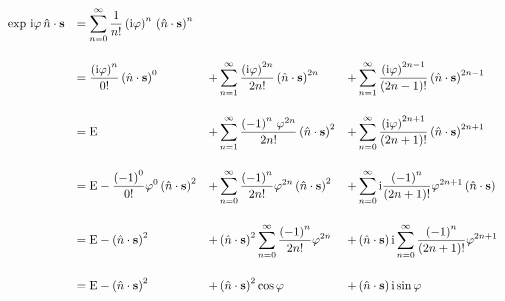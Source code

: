 \documentclass[10pt,a4paper]{article}
\newcommand{\const}[1]{\text{\rmfamily\upshape #1}}
\renewcommand{\i}{\const{i}}
\begin{document}
\begin{equation*}
\begin{array}{rlll}
    \exp \, \i \varphi \,
    \hat{n} \cdot \mathbf{s}
    &\displaystyle =
    \sum_{n=0}^\infty
    \frac{1}{n!}
    \left(\i \varphi\right)^n \,
    \left(\hat{n} \cdot \mathbf{s}\right)^n
    \\[25pt]
    &\displaystyle =
    \frac{\left(\i\varphi\right)^n}{0!}
    \left(\hat{n} \cdot \mathbf{s}\right)^0
    &\displaystyle +
    \sum_{n=1}^\infty
    \frac{\left(\i\varphi\right)^{2n}}{2n!}
    \left(\hat{n} \cdot \mathbf{s}\right)^{2n}
    &\displaystyle +
    \sum_{n=1}^\infty
    \frac{\left(\i\varphi\right)^{2n-1}}{(2n-1)!}
    \left(\hat{n} \cdot \mathbf{s}\right)^{2n-1}
    \\[25pt]
    &\displaystyle =
    \const{E}
    &\displaystyle +
    \sum_{n=1}^\infty
    \frac{\left(-1\right)^n \, \varphi^{2n}}{2n!}
    \left(\hat{n} \cdot \mathbf{s}\right)^2
    &\displaystyle +
    \sum_{n=0}^\infty
    \frac{\left(\i\varphi\right)^{2n+1}}{(2n+1)!}
    \left(\hat{n} \cdot \mathbf{s}\right)^{2n+1}
    \\[25pt]
    &\displaystyle =
    \const{E}
    -
    \frac{\left(-1\right)^0}{0!}
    \varphi^{0}
    \left(\hat{n} \cdot \mathbf{s}\right)^2
    &\displaystyle +
    \sum_{n=0}^\infty
    \frac{\left(-1\right)^n}{2n!}
    \varphi^{2n}
    \left(\hat{n} \cdot \mathbf{s}\right)^2
    &\displaystyle +
    \sum_{n=0}^\infty
    \i
    \frac{\left(-1\right)^n}{(2n+1)!}
    \varphi^{2n+1}
    \left(\hat{n} \cdot \mathbf{s}\right)
    \\[25pt]
    &\displaystyle =
    \const{E}
    -
    \left(\hat{n} \cdot \mathbf{s}\right)^2
    &\displaystyle +
    \left(\hat{n} \cdot \mathbf{s}\right)^2
    \sum_{n=0}^\infty
    \frac{\left(-1\right)^n}{2n!}
    \varphi^{2n}
    &\displaystyle +
    \left(\hat{n} \cdot \mathbf{s}\right)
    \i
    \sum_{n=0}^\infty
    \frac{\left(-1\right)^n}{(2n+1)!}
    \varphi^{2n+1}
    \\[25pt]
    &\displaystyle =
    \const{E}
    -
    \left(\hat{n} \cdot \mathbf{s}\right)^2
    &\displaystyle +
    \left(\hat{n} \cdot \mathbf{s}\right)^2
    \cos \varphi
    &\displaystyle +
    \left(\hat{n} \cdot \mathbf{s}\right)
    \i
    \sin \varphi
\end{array}
\end{equation*}
\end{document}

